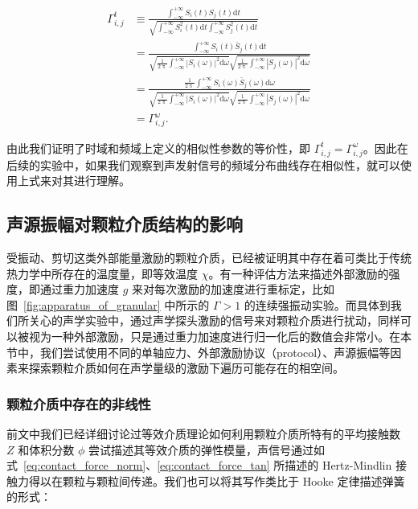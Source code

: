 \begin{equation}
  \begin{aligned}
    \Gamma_{i,j}^{t} &\equiv \frac{\int_{-\infty}^{+\infty}S_{i}(t)S_{j}(t)\mathrm{d}t}{\sqrt{\int_{-\infty}^{+\infty}S_{i}^{2}(t)\mathrm{d}t\int_{-\infty}^{+\infty}S_{j}^{2}(t)\mathrm{d}t}}\\
    &= \frac{\int_{-\infty}^{+\infty}S_{i}(t)\bar{S}_{j}(t)\mathrm{d}t}{\sqrt{\frac{1}{2\uppi}\int_{-\infty}^{+\infty}|S_{i}(\omega)|^{2}\mathrm{d}\omega}\sqrt{\frac{1}{2\uppi}\int_{-\infty}^{+\infty}|S_{j}(\omega)|^{2}\mathrm{d}\omega}}\\
    &= \frac{\frac{1}{2\uppi}\int_{-\infty}^{+\infty}S_{i}(\omega)\bar{S}_{j}(\omega)\mathrm{d}\omega}{\sqrt{\frac{1}{2\uppi}\int_{-\infty}^{+\infty}|S_{i}(\omega)|^{2}\mathrm{d}\omega}\sqrt{\frac{1}{2\uppi}\int_{-\infty}^{+\infty}|S_{j}(\omega)|^{2}\mathrm{d}\omega}}\\
    &= \Gamma_{i,j}^{\omega}.
  \end{aligned}
\end{equation}

由此我们证明了时域和频域上定义的相似性参数的等价性，即 $\Gamma_{i,j}^{t}=\Gamma_{i,j}^{\omega}$。因此在后续的实验中，如果我们观察到声发射信号的频域分布曲线存在相似性，就可以使用上式来对其进行理解。

\subsection{声源振幅对颗粒介质结构的影响}

受振动、剪切这类外部能量激励的颗粒介质，已经被证明其中存在着可类比于传统热力学中所存在的温度量，即等效温度 $\chi$。有一种评估方法来描述外部激励的强度，即通过重力加速度 $g$ 来对每次激励的加速度进行重标定，比如图~\ref{fig:apparatus_of_granular} 中所示的 $\Gamma>1$ 的连续强振动实验。而具体到我们所关心的声学实验中，通过声学探头激励的信号来对颗粒介质进行扰动，同样可以被视为一种外部激励，只是通过重力加速度进行归一化后的数值会非常小。在本节中，我们尝试使用不同的单轴应力、外部激励协议（protocol）、声源振幅等因素来探索颗粒介质如何在声学量级的激励下遍历可能存在的相空间。


\subsubsection{颗粒介质中存在的非线性}

前文中我们已经详细讨论过等效介质理论如何利用颗粒介质所特有的平均接触数 $Z$ 和体积分数 $\phi$ 尝试描述其等效介质的弹性模量，声信号通过如式~\eqref{eq:contact_force_norm}、\eqref{eq:contact_force_tan} 所描述的 Hertz-Mindlin 接触力得以在颗粒与颗粒间传递。我们也可以将其写作类比于 Hooke 定律描述弹簧的形式：

